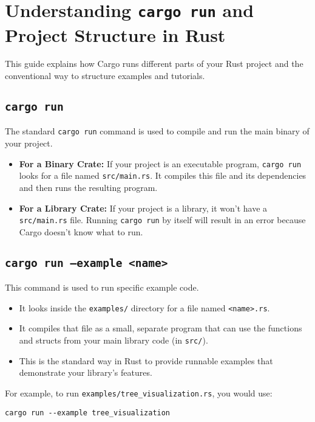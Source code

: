 \section{Understanding \texttt{cargo run} and Project Structure in Rust}
\label{sec:understanding_cargo_run}

This guide explains how Cargo runs different parts of your Rust project and the conventional way to structure examples and tutorials.

\subsection{\texttt{cargo run}}
\label{subsec:cargo_run}

The standard \texttt{cargo run} command is used to compile and run the main binary of your project.

\begin{itemize}
    \item \textbf{For a Binary Crate:} If your project is an executable program, \texttt{cargo run} looks for a file named \texttt{src/main.rs}. It compiles this file and its dependencies and then runs the resulting program.
    \item \textbf{For a Library Crate:} If your project is a library, it won't have a \texttt{src/main.rs} file. Running \texttt{cargo run} by itself will result in an error because Cargo doesn't know what to run.
\end{itemize}

\subsection{\texttt{cargo run --example <name>}}
\label{subsec:cargo_run_example}

This command is used to run specific example code.

\begin{itemize}
    \item It looks inside the \texttt{examples/} directory for a file named \texttt{<name>.rs}.
    \item It compiles that file as a small, separate program that can use the functions and structs from your main library code (in \texttt{src/}).
    \item This is the standard way in Rust to provide runnable examples that demonstrate your library's features.
\end{itemize}

For example, to run \texttt{examples/tree\_visualization.rs}, you would use:
\begin{verbatim}
cargo run --example tree_visualization
\end{verbatim}

